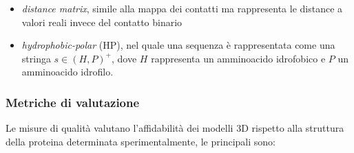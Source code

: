 \begin{itemize}
	\item \textit{distance matrix}, simile alla mappa dei contatti ma rappresenta le distance a valori reali invece del contatto binario\\
	\item \textit{hydrophobic-polar} (HP), nel quale una sequenza è rappresentata come una stringa $s\in (H,P)^{+}$, dove $H$ rappresenta un amminoacido idrofobico e $P$ un amminoacido idrofilo.
	
\end{itemize}

\subsubsection{Metriche di valutazione}
Le misure di qualità valutano l'affidabilità dei modelli 3D rispetto alla struttura della proteina determinata sperimentalmente, le principali sono\supercite{marquez2015soft}:

